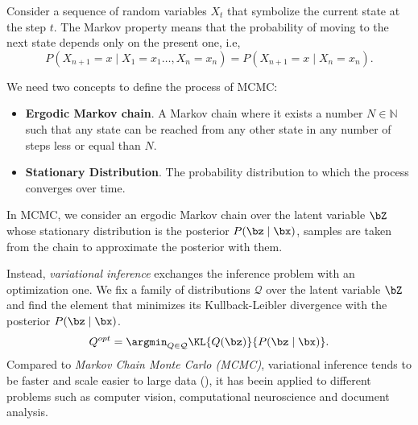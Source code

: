 \begin{center}
\end{center}

Consider a sequence of random variables \(X_{t}\) that symbolize the current state at the step \(t\). The Markov property means that the probability of moving to the next state depends only on the present one, i.e,
\[
  P(X_{n+1} = x \mid X_{1} = x_{1} \dots, X_{n} = x_{n}) = P(X_{n+1} = x \mid X_{n} = x_{n}).
\]

We need two concepts to define the process of MCMC:
\begin{itemize}
  \item \textbf{Ergodic Markov chain}. A Markov chain where it exists a number \(N \in \mathbb{N}\) such that any state can be reached from any other state in any number of steps less or equal than \(N\).
  \item \textbf{Stationary Distribution}. The probability distribution to which the process converges over time. 
\end{itemize}

In MCMC, we consider an ergodic Markov chain over the latent variable \(\bZ\) whose stationary distribution is the posterior \(P(\bz \mid \bx)\), samples are taken from the chain to approximate the posterior with them.

Instead, \emph{variational inference} exchanges the inference problem with an optimization one. We fix a family of distributions \(\mathcal{Q}\) over the latent variable \(\bZ\) and find the element that minimizes its Kullback-Leibler divergence with the posterior \(P(\bz \mid \bx)\).
\[
  Q^{opt} = \argmin_{Q \in \mathcal{Q}} \KL{Q(\bz)}{P(\bz \mid \bx)}.
\]
Compared to \emph{Markov Chain Monte Carlo (MCMC)}, variational inference tends to be faster and scale easier to large data (\cite{blei2017variational}), it has beein applied to different problems such as computer vision, computational neuroscience and document analysis.

